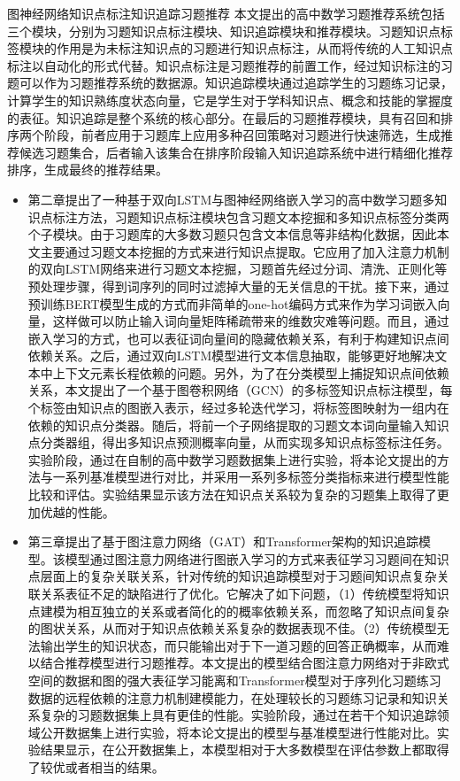 \begin{abstractC}{图神经网络}{知识点标注}{知识追踪}{习题推荐}{}
    本文提出的高中数学习题推荐系统包括三个模块，分别为习题知识点标注模块、知识追踪模块和推荐模块。习题知识点标签模块的作用是为未标注知识点的习题进行知识点标注，从而将传统的人工知识点标注以自动化的形式代替。知识点标注是习题推荐的前置工作，经过知识标注的习题可以作为习题推荐系统的数据源。知识追踪模块通过追踪学生的习题练习记录，计算学生的知识熟练度状态向量，它是学生对于学科知识点、概念和技能的掌握度的表征。知识追踪是整个系统的核心部分。在最后的习题推荐模块，具有召回和排序两个阶段，前者应用于习题库上应用多种召回策略对习题进行快速筛选，生成推荐候选习题集合，后者输入该集合在排序阶段输入知识追踪系统中进行精细化推荐排序，生成最终的推荐结果。
    \begin{itemize}
        \item 第二章提出了一种基于双向LSTM与图神经网络嵌入学习的高中数学习题多知识点标注方法，习题知识点标注模块包含习题文本挖掘和多知识点标签分类两个子模块。由于习题库的大多数习题只包含文本信息等非结构化数据，因此本文主要通过习题文本挖掘的方式来进行知识点提取。它应用了加入注意力机制的双向LSTM网络来进行习题文本挖掘，习题首先经过分词、清洗、正则化等预处理步骤，得到词序列的同时过滤掉大量的无关信息的干扰。接下来，通过预训练BERT模型生成的方式而非简单的one-hot编码方式来作为学习词嵌入向量，这样做可以防止输入词向量矩阵稀疏带来的维数灾难等问题。而且，通过嵌入学习的方式，也可以表征词向量间的隐藏依赖关系，有利于构建知识点间依赖关系。之后，通过双向LSTM模型进行文本信息抽取，能够更好地解决文本中上下文元素长程依赖的问题。另外，为了在分类模型上捕捉知识点间依赖关系，本文提出了一个基于图卷积网络（GCN）的多标签知识点标注模型，每个标签由知识点的图嵌入表示，经过多轮迭代学习，将标签图映射为一组内在依赖的知识点分类器。随后，将前一个子网络提取的习题文本词向量输入知识点分类器组，得出多知识点预测概率向量，从而实现多知识点标签标注任务。实验阶段，通过在自制的高中数学习题数据集上进行实验，将本论文提出的方法与一系列基准模型进行对比，并采用一系列多标签分类指标来进行模型性能比较和评估。实验结果显示该方法在知识点关系较为复杂的习题集上取得了更加优越的性能。
        \item 第三章提出了基于图注意力网络（GAT）和Transformer架构的知识追踪模型。该模型通过图注意力网络进行图嵌入学习的方式来表征学习习题间在知识点层面上的复杂关联关系，针对传统的知识追踪模型对于习题间知识点复杂关联关系表征不足的缺陷进行了优化。它解决了如下问题，（1）传统模型将知识点建模为相互独立的关系或者简化的的概率依赖关系，而忽略了知识点间复杂的图状关系，从而对于知识点依赖关系复杂的数据表现不佳。（2）传统模型无法输出学生的知识状态，而只能输出对于下一道习题的回答正确概率，从而难以结合推荐模型进行习题推荐。本文提出的模型结合图注意力网络对于非欧式空间的数据和图的强大表征学习能离和Transformer模型对于序列化习题练习数据的远程依赖的注意力机制建模能力，在处理较长的习题练习记录和知识关系复杂的习题数据集上具有更佳的性能。实验阶段，通过在若干个知识追踪领域公开数据集上进行实验，将本论文提出的模型与基准模型进行性能对比。实验结果显示，在公开数据集上，本模型相对于大多数模型在评估参数上都取得了较优或者相当的结果。

\end{itemize}
\end{abstractC}
